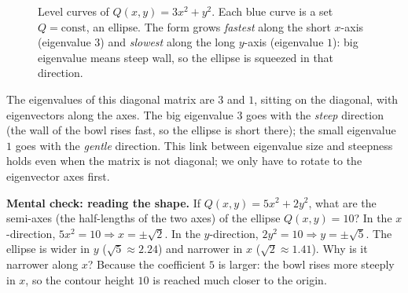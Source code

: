 \begin{figure}[H]
\centering
{}
\caption{Level curves of $Q(x,y)=3x^2+y^2$. Each blue curve is a set $Q=\text{const}$,
an ellipse. The form grows \emph{fastest} along the short $x$-axis (eigenvalue $3$)
and \emph{slowest} along the long $y$-axis (eigenvalue $1$): big eigenvalue means
steep wall, so the ellipse is squeezed in that direction.}
\label{ch36:fig-levelcurves}
\end{figure}

The eigenvalues of this diagonal matrix are $3$ and $1$, sitting on the
diagonal, with eigenvectors along the axes. The big eigenvalue $3$ goes with the
\emph{steep} direction (the wall of the bowl rises fast, so the ellipse is short
there); the small eigenvalue $1$ goes with the \emph{gentle} direction. This link
between eigenvalue size and steepness holds even when the matrix is not diagonal; we
only have to rotate to the eigenvector axes first.

\begin{recoverybox}
\textbf{Mental check: reading the shape.} If $Q(x,y) = 5x^2 + 2y^2$, what are the
semi-axes (the half-lengths of the two axes) of the ellipse $Q(x,y) = 10$? In the $x$-direction, $5x^2 = 10 \Rightarrow
x = \pm\sqrt{2}$. In the $y$-direction, $2y^2 = 10 \Rightarrow y = \pm\sqrt{5}$. The
ellipse is wider in $y$ ($\sqrt{5} \approx 2.24$) and narrower in $x$ ($\sqrt{2}
\approx 1.41$). Why is it narrower along $x$? Because the coefficient $5$ is larger:
the bowl rises more steeply in $x$, so the contour height $10$ is reached much closer
to the origin.
\end{recoverybox}

